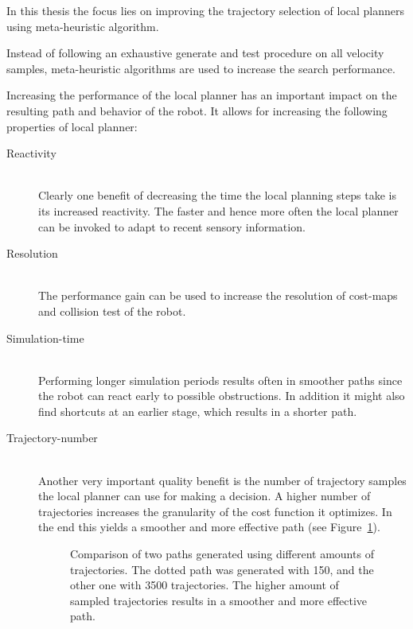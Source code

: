 In this thesis the focus lies on improving the trajectory selection of local planners using meta-heuristic algorithm. 

Instead of following an exhaustive generate and test procedure on all velocity samples, meta-heuristic algorithms are used to increase the search performance. 

Increasing the performance of the local planner has an important impact on the resulting path and behavior of the robot. 
It allows for increasing the following properties of local planner:
\begin{description}
\item[Reactivity]\hfill \\
Clearly one benefit of decreasing the time the local planning steps take is its increased reactivity. The faster and hence more often the local planner can be invoked to adapt to recent sensory information.

\item[Resolution]\hfill \\
The performance gain can be used to increase the resolution of cost-maps and collision test of the robot.

\item[Simulation-time]\hfill \\
Performing longer simulation periods results often in smoother paths since the robot can react early to possible obstructions. In addition it might also find shortcuts at an earlier stage, which results in a shorter path. 

\item[Trajectory-number]\hfill \\
Another very important quality benefit is the number of trajectory samples the local planner can use for making a decision. A higher number of trajectories increases the granularity of the cost function it optimizes. In the end this yields a smoother and more effective path (see Figure~\ref{fig:fig_smooth}).

\begin{figure}[thb]
   \footnotesize
   \centering
   \setlength\fboxsep{0pt}
   \setlength\fboxrule{0.5pt}
   \myfloatalign
   \captionsetup[subfigure]{labelformat=empty} 
    \subfloat[]
    {  
       \def\svgwidth{\textwidth}
       
    }
    \caption[Comparison of two paths generated using different amounts of trajectories.]{Comparison of two paths generated using different amounts of trajectories. The dotted path was generated with 150, and the other one with 3500 trajectories. The higher amount of sampled trajectories results in a smoother and more effective path.}  
     \label{fig:fig_smooth}
\end{figure}
\end{description}

